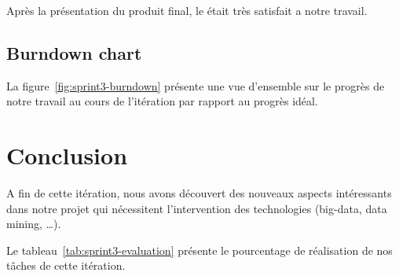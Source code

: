 Après la présentation du produit final, le  était très satisfait
a notre travail.

\subsection{Burndown chart}

La figure~\ref{fig:sprint3-burndown} présente une vue d'ensemble sur le progrès
de notre travail au cours de l'itération par rapport au progrès idéal.



\section*{Conclusion}

A fin de cette itération, nous avons découvert des nouveaux aspects intéressants dans notre projet
qui nécessitent l'intervention des technologies (big-data, data mining, \ldots).

Le tableau~\ref{tab:sprint3-evaluation} présente le pourcentage de
réalisation de nos tâches de cette itération.

